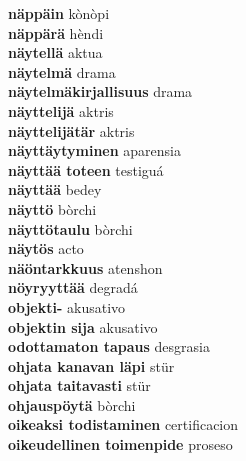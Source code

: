 \textbf{ näppäin  } kònòpi \\
\textbf{ näppärä  } hèndi \\
\textbf{ näytellä  } aktua \\
\textbf{ näytelmä  } drama \\
\textbf{ näytelmäkirjallisuus  } drama \\
\textbf{ näyttelijä  } aktris \\
\textbf{ näyttelijätär  } aktris \\
\textbf{ näyttäytyminen  } aparensia \\
\textbf{ näyttää toteen  } testiguá \\
\textbf{ näyttää  } bedey \\
\textbf{ näyttö  } bòrchi \\
\textbf{ näyttötaulu  } bòrchi \\
\textbf{ näytös  } acto \\
\textbf{ näöntarkkuus  } atenshon \\
\textbf{ nöyryyttää  } degradá \\
\textbf{ objekti-  } akusativo \\
\textbf{ objektin sija  } akusativo \\
\textbf{ odottamaton tapaus  } desgrasia \\
\textbf{ ohjata kanavan läpi  } stür \\
\textbf{ ohjata taitavasti  } stür \\
\textbf{ ohjauspöytä  } bòrchi \\
\textbf{ oikeaksi todistaminen  } certificacion \\
\textbf{ oikeudellinen toimenpide  } proseso \\
